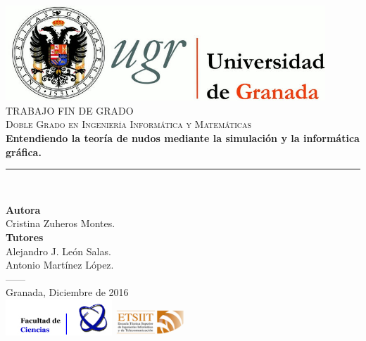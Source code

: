 \begin{titlepage}
 
 
\newlength{\centeroffset}
\setlength{\centeroffset}{-0.5\oddsidemargin}
\addtolength{\centeroffset}{0.5\evensidemargin}
\thispagestyle{empty}

\noindent\hspace*{\centeroffset}\begin{minipage}{\textwidth}

\centering
\includegraphics[width=0.9\textwidth]{img/logo_ugr.jpg}\\[1.4cm]

\textsc{ \Large TRABAJO FIN DE GRADO\\[0.2cm]}
\textsc{ Doble Grado en Ingeniería Informática y Matemáticas}\\[1cm]
% 
{\LARGE\bfseries Entendiendo la teoría de nudos mediante la simulación y la informática gráfica. 
\\
}
\noindent\rule[-1ex]{\textwidth}{3pt}\\[3.5ex]
\end{minipage}

\vspace{2.5cm}
\noindent\hspace*{\centeroffset}\begin{minipage}{\textwidth}
\centering

\textbf{Autora}\\ {Cristina Zuheros Montes.}\\[2.5ex]
\textbf{Tutores}\\
{Alejandro J. León Salas.}\\
{Antonio Martínez López.}\\
\textsc{------}\\[1cm]
Granada, Diciembre de 2016\\[3cm]
\includegraphics[width=0.3\textwidth]{img/logo_ciencias.jpg} \hfill \includegraphics[width=0.2\textwidth]{img/logo_etsiit.png}\\[0.1cm]

\end{minipage}
\end{titlepage}